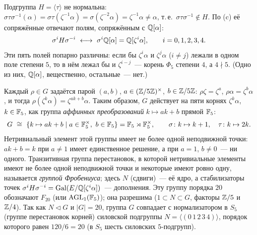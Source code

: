 \begin{example}[3.23]
Подгруппа $H=\langle\tau\rangle$ не нормальна: $\sigma\tau\sigma^{-1}(\alpha)=\sigma\tau(\zeta^{-1}\alpha)=\sigma(\zeta^{-2}\alpha)=\zeta^{-1}\alpha\ne\alpha$, т.\,е.\
$\sigma\tau\sigma^{-1}\notin H$. По (c) её сопряжённые отвечают полям, сопряжённым с $\mathbb Q[\alpha]$:
\[
\sigma^iH\sigma^{-i}\ \longleftrightarrow\ \sigma^i\Q[\alpha]=\Q[\zeta^i\alpha],\qquad i=0,1,2,3,4 .
\]
Эти пять полей попарно различны: если бы $\zeta^i\alpha$ и $\zeta^j\alpha$ ($i\ne j$) лежали в одном поле степени $5$, то в нём лежал бы и
$\zeta^{i-j}$~--- корень $\Phi_5$ степени $4$, а $4\nmid5$. (Одно из них, $\mathbb Q[\alpha]$, вещественно, остальные~--- нет.)
\end{example}

\begin{remark}
Каждый $\rho\in G$ задаётся парой $(a,b)$, $a\in(\mathbb Z/5\mathbb Z)^\times$, $b\in\mathbb Z/5\mathbb Z$: $\rho\zeta=\zeta^a$, $\rho\alpha=\zeta^b\alpha$, и тогда
$\rho(\zeta^k\alpha)=\zeta^{ak+b}\alpha$. Таким образом, $G$ действует на пяти корнях $\zeta^k\alpha$, $k\in\mathbb F_5$, как группа
\emph{аффинных преобразований} $k\mapsto ak+b$ прямой $\mathbb F_5$:
\[
G\ \cong\ \{k\mapsto ak+b\mid a\in\F_5^\times,\ b\in\F_5\}=\F_5\rtimes\F_5^\times,\qquad\sigma\colon k\mapsto k+1,\quad\tau\colon k\mapsto2k .
\]
Нетривиальный элемент этой группы имеет не более одной неподвижной точки: $ak+b=k$ при $a\ne1$ имеет единственное решение,
а при $a=1$, $b\ne0$~--- ни одного. Транзитивная группа перестановок, в которой нетривиальные элементы имеют не более одной
неподвижной точки и некоторые имеют ровно одну, называется \emph{группой Фробениуса}; здесь $N$ (сдвиги)~--- её ядро, а
стабилизаторы точек $\sigma^iH\sigma^{-i}=\operatorname{Gal}(E/\mathbb Q[\zeta^i\alpha])$~--- дополнения. Эту группу порядка $20$ обозначают $F_{20}$
(или $\mathrm{AGL}_1(\mathbb F_5)$); она разрешима ($1\subset N\subset G$, факторы $\mathbb Z/5$ и $\mathbb Z/4$). Так как $N\triangleleft G$ и $|G|=20$,
группа $G$ совпадает с нормализатором в $S_5$ (группе перестановок корней) силовской подгруппы $N=\langle(0\,1\,2\,3\,4)\rangle$, порядок которого равен $120/6=20$ (в $S_5$ шесть силовских
$5$-подгрупп).
\end{remark}

